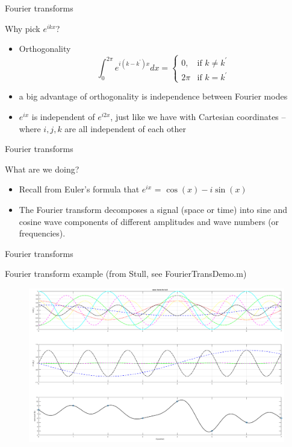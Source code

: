 \begin{frame}{Fourier transforms}

Why pick $e^{ikx}$?
\begin{itemize}
	\item Orthogonality $$\int^{2\pi}_{0} e^{i(k-k^\prime)x} dx = \begin{cases}
    0,& \text{if } k\neq k^\prime\\
    2\pi & \text{if } k=k^\prime
\end{cases}$$
	\item a big advantage of orthogonality is independence between Fourier modes
	\item $e^{ix}$ is independent of $e^{i2x}$, just like we have with Cartesian coordinates -- where $i,j,k$ are all independent of each other
	\end{itemize}
\end{frame}

\begin{frame}{Fourier transforms}

What are we doing?
\begin{itemize}
	\item Recall from Euler's formula that $e^{ix}$ = $\cos (x) - i\sin (x)$
	\item The Fourier transform decomposes a signal (space or time) into sine and cosine wave components of different amplitudes and wave numbers (or frequencies).
	\end{itemize}
\end{frame}

\begin{frame}{Fourier transforms}

Fourier transform example (from Stull, see FourierTransDemo.m)
\begin{figure}
	\includegraphics[width=\textwidth]{fourier.png}
\end{figure}
\end{frame}

